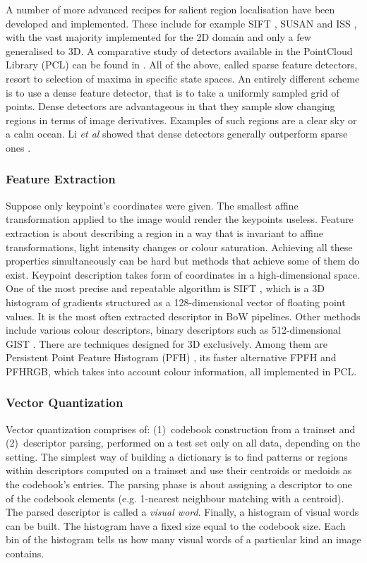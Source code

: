 \documentclass[11pt,twoside]{article}
\begin{document}
    A number of more advanced recipes for salient region localisation have been developed and implemented. These include for example SIFT \cite{sift_keypoint}, SUSAN \cite{susan_keypoint} and ISS \cite{iss_keypoint}, with the vast majority implemented for the 2D domain and only a few generalised to 3D. A comparative study of detectors available in the PointCloud Library (PCL) can be found in \cite{pcl_keypoint_comparision, 3d_keypoint_eval}. All of the above, called sparse feature detectors, resort to selection of maxima in specific state spaces. An entirely different scheme is to use a dense feature detector, that is to take a uniformly sampled grid of points. Dense detectors are advantageous in that they sample slow changing regions in terms of image derivatives. Examples of such regions are a clear sky or a calm ocean. Li \emph{et al} showed that dense detectors generally outperform sparse ones \cite{fei2005bayesian}.
    
  \subsubsection{Feature Extraction}
    Suppose only keypoint's coordinates were given. The smallest affine transformation applied to the image would render the keypoints useless. Feature extraction is about describing a region in a way that is invariant to affine transformations, light intensity changes or colour saturation. Achieving all these properties simultaneously can be hard but methods that achieve some of them do exist. Keypoint description takes form of coordinates in a high-dimensional space. One of the most precise and repeatable algorithm is SIFT \cite{sift_features}, which is a 3D histogram of gradients structured as a 128-dimensional vector of floating point values. It is the most often extracted descriptor in BoW pipelines. Other methods include various colour descriptors, binary descriptors such as 512-dimensional GIST \cite{ponce2011cv}. There are techniques designed for 3D exclusively. Among them are Persistent Point Feature Histogram (PFH) \cite{pfh_rusu2008}, its faster alternative FPFH \cite{fpfh_rusu2009} and PFHRGB, which takes into account colour information, all implemented in PCL.
    
  \subsubsection{Vector Quantization}
    Vector quantization comprises of: (1)~codebook construction from a trainset and (2)~descriptor parsing, performed on a test set only on all data, depending on the setting. The simplest way of building a dictionary is to find patterns or regions within descriptors computed on a trainset and use their centroids or medoids as the codebook's entries. The parsing phase is about assigning a descriptor to one of the codebook elements (e.g. 1-nearest neighbour matching with a centroid). The parsed descriptor is called a \textit{visual word}. Finally, a histogram of visual words can be built. The histogram have a fixed size equal to the codebook size. Each bin of the histogram tells us how many visual words of a particular kind an image contains.
    
\end{document}

